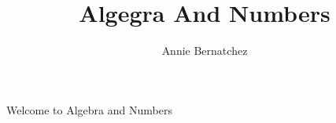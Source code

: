 \documentclass{article}
\title{Algegra And Numbers}
\author{Annie Bernatchez}
\begin{document}
  \maketitle
  \newpage

  Welcome to Algebra and Numbers
\end{document}
